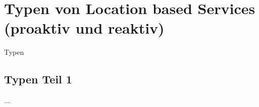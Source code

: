 \section{Typen von Location based Services (proaktiv und reaktiv)}
Typen
	\subsection{Typen Teil 1}
...
